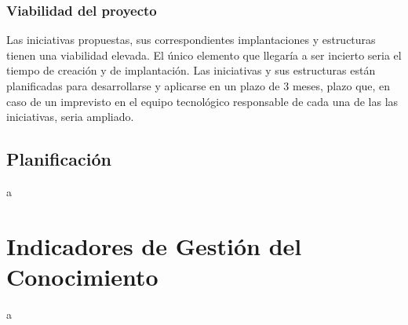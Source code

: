 \documentclass[a4paper]{article}
\begin{document}
\subsubsection{Viabilidad del proyecto}
Las iniciativas propuestas, sus correspondientes implantaciones y estructuras tienen una viabilidad elevada. El único elemento que llegaría a ser incierto seria el tiempo de creación y de implantación. Las iniciativas y sus estructuras están planificadas para desarrollarse y aplicarse en un plazo de 3 meses, plazo que, en caso de un imprevisto en el equipo tecnológico responsable de cada una de las las iniciativas, seria ampliado.


\subsection{Planificación}

a

\section{Indicadores de Gestión del Conocimiento}

a
\end{document}
